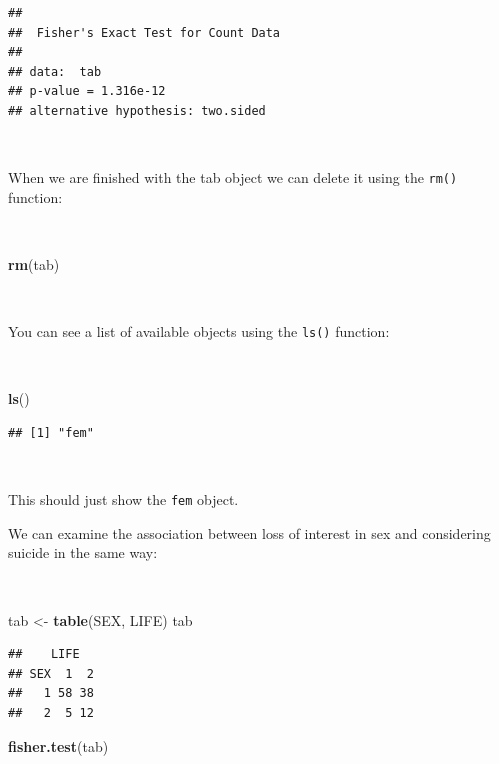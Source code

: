 \documentclass[12pt,a4paper]{book}
\newenvironment{Shaded}{\begin{snugshade}}{\end{snugshade}}
\newcommand{\KeywordTok}[1]{\textcolor[rgb]{0.13,0.29,0.53}{\textbf{#1}}}
\newcommand{\StringTok}[1]{\textcolor[rgb]{0.31,0.60,0.02}{#1}}
\newcommand{\NormalTok}[1]{#1}
\theoremstyle{definition}
\theoremstyle{definition}
\theoremstyle{definition}
\theoremstyle{remark}
\begin{document}
\begin{verbatim}
## 
##  Fisher's Exact Test for Count Data
## 
## data:  tab
## p-value = 1.316e-12
## alternative hypothesis: two.sided
\end{verbatim}

~

When we are finished with the tab object we can delete it using the
\texttt{rm()} function:

~

\begin{Shaded}
\begin{Highlighting}[]
\KeywordTok{rm}\NormalTok{(tab)}
\end{Highlighting}
\end{Shaded}

~

You can see a list of available objects using the \texttt{ls()}
function:

~

\begin{Shaded}
\begin{Highlighting}[]
\KeywordTok{ls}\NormalTok{()}
\end{Highlighting}
\end{Shaded}

\begin{verbatim}
## [1] "fem"
\end{verbatim}

~

This should just show the \texttt{fem} object.

We can examine the association between loss of interest in sex and
considering suicide in the same way:

~

\begin{Shaded}
\begin{Highlighting}[]
\NormalTok{tab <-}\StringTok{ }\KeywordTok{table}\NormalTok{(SEX, LIFE)}
\NormalTok{tab}
\end{Highlighting}
\end{Shaded}

\begin{verbatim}
##    LIFE
## SEX  1  2
##   1 58 38
##   2  5 12
\end{verbatim}

\begin{Shaded}
\begin{Highlighting}[]
\KeywordTok{fisher.test}\NormalTok{(tab)}
\end{Highlighting}
\end{Shaded}
\end{document}
